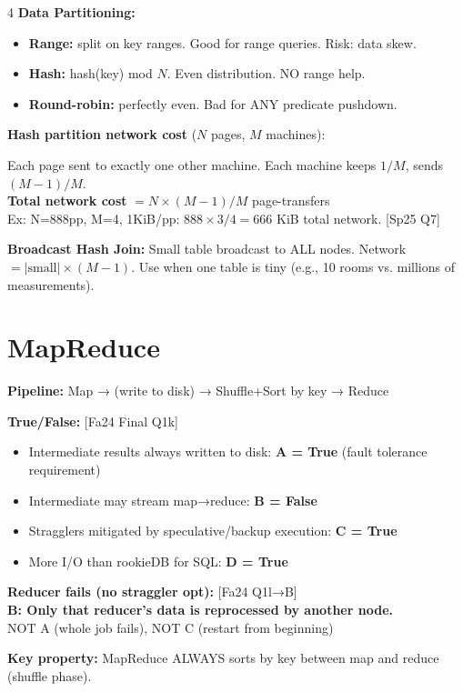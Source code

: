 \documentclass[8pt,letterpaper]{article}
\newcommand{\key}[1]{\textbf{\color{red!70!black}#1}}
\newcommand{\ans}[1]{\textbf{\color{blue!80!black}#1}}
\newcommand{\qref}[1]{{\fontsize{3.5}{4}\selectfont\color{purple!60!black}[#1]}}
\begin{document}
\begin{multicols*}{4}
\key{Data Partitioning:}
\begin{itemize}
  \item \textbf{Range:} split on key ranges. Good for range queries. Risk: data skew.
  \item \textbf{Hash:} hash(key) mod $N$. Even distribution. NO range help.
  \item \textbf{Round-robin:} perfectly even. Bad for ANY predicate pushdown.
\end{itemize}

\key{Hash partition network cost} ($N$ pages, $M$ machines):
\begin{ansbox}
Each page sent to exactly one other machine. Each machine keeps $1/M$, sends $(M-1)/M$.\\
\textbf{Total network cost} $= N \times (M-1)/M$ page-transfers\\
Ex: N=888pp, M=4, 1KiB/pp: $888 \times 3/4 = 666$ KiB total network. \qref{Sp25 Q7}
\end{ansbox}

\key{Broadcast Hash Join:} Small table broadcast to ALL nodes. Network $= |\text{small}| \times (M-1)$. Use when one table is tiny (e.g., 10 rooms vs. millions of measurements).

\section{MapReduce}
\key{Pipeline:} Map → (write to disk) → Shuffle+Sort by key → Reduce

\key{True/False:} \qref{Fa24 Final Q1k}
\begin{itemize}
  \item Intermediate results always written to disk: \ans{A = True} (fault tolerance requirement)
  \item Intermediate may stream map→reduce: \ans{B = False}
  \item Stragglers mitigated by speculative/backup execution: \ans{C = True}
  \item More I/O than rookieDB for SQL: \ans{D = True}
\end{itemize}

\key{Reducer fails (no straggler opt):} \qref{Fa24 Q1l→B}\\
\ans{B: Only that reducer's data is reprocessed by another node.}\\
NOT A (whole job fails), NOT C (restart from beginning)

\key{Key property:} MapReduce ALWAYS sorts by key between map and reduce (shuffle phase).


\end{multicols*}
\end{document}
